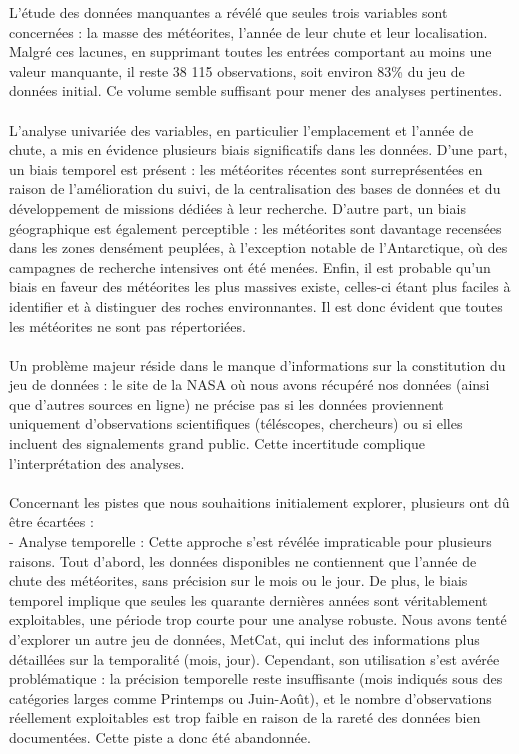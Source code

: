 \documentclass[12pt]{article}
\begin{document}
L’étude des données manquantes a révélé que seules trois variables sont concernées : la masse des météorites, l’année de leur chute et leur localisation. Malgré ces lacunes, en supprimant toutes les entrées comportant au moins une valeur manquante, il reste 38 115 observations, soit environ 83\% du jeu de données initial. Ce volume semble suffisant pour mener des analyses pertinentes.\\
\\
L’analyse univariée des variables, en particulier l’emplacement et l’année de chute, a mis en évidence plusieurs biais significatifs dans les données. D’une part, un biais temporel est présent : les météorites récentes sont surreprésentées en raison de l’amélioration du suivi, de la centralisation des bases de données et du développement de missions dédiées à leur recherche. D’autre part, un biais géographique est également perceptible : les météorites sont davantage recensées dans les zones densément peuplées, à l’exception notable de l’Antarctique, où des campagnes de recherche intensives ont été menées. Enfin, il est probable qu’un biais en faveur des météorites les plus massives existe, celles-ci étant plus faciles à identifier et à distinguer des roches environnantes. Il est donc évident que toutes les météorites ne sont pas répertoriées.\\
\\
Un problème majeur réside dans le manque d’informations sur la constitution du jeu de données : le site de la NASA où nous avons récupéré nos données (ainsi que d’autres sources en ligne) ne précise pas si les données proviennent uniquement d’observations scientifiques (téléscopes, chercheurs) ou si elles incluent des signalements grand public. Cette incertitude complique l’interprétation des analyses.\\
\\
Concernant les pistes que nous souhaitions initialement explorer, plusieurs ont dû être écartées :
\\
 - Analyse temporelle : Cette approche s’est révélée impraticable pour plusieurs raisons. Tout d’abord, les données disponibles ne contiennent que l’année de chute des météorites, sans précision sur le mois ou le jour. De plus, le biais temporel implique que seules les quarante dernières années sont véritablement exploitables, une période trop courte pour une analyse robuste. Nous avons tenté d’explorer un autre jeu de données, MetCat, qui inclut des informations plus détaillées sur la temporalité (mois, jour). Cependant, son utilisation s’est avérée problématique : la précision temporelle reste insuffisante (mois indiqués sous des catégories larges comme Printemps ou Juin-Août), et le nombre d’observations réellement exploitables est trop faible en raison de la rareté des données bien documentées. Cette piste a donc été abandonnée.\\
\end{document}
